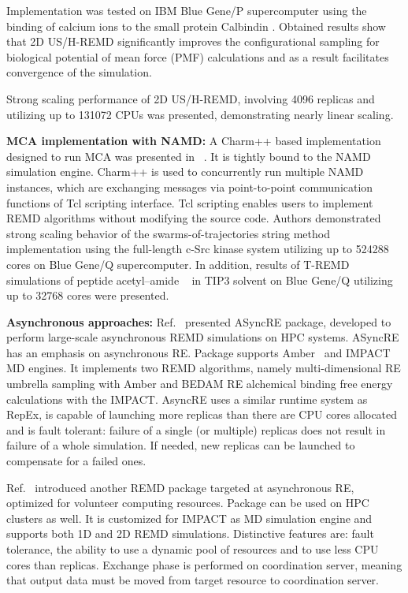 \documentclass{sig-alternate-05-2015}
\begin{document}
Implementation was tested on IBM Blue Gene/P supercomputer using the binding of calcium ions to the small protein Calbindin . Obtained results show that 2D US/H-REMD significantly improves the configurational sampling for biological potential of mean force (PMF) calculations and as a result facilitates convergence of the simulation.

Strong scaling performance of 2D US/H-REMD, involving 4096 replicas and utilizing up to 131072 CPUs was presented, demonstrating nearly linear scaling.

{\bf MCA implementation with NAMD:} A Charm++ based implementation designed to run MCA was presented in ~\cite{jiang2014}. It is tightly bound to the NAMD simulation engine. Charm++ is used to concurrently run multiple NAMD instances, which are exchanging messages via point-to-point communication functions of Tcl scripting interface. Tcl scripting enables users to implement REMD algorithms without modifying the source code.  Authors demonstrated strong scaling behavior of the swarms-of-trajectories string method implementation using the full-length c-Src kinase system utilizing up to 524288 cores on Blue Gene/Q supercomputer. In addition, results of T-REMD simulations of peptide acetyl--amide ~\cite{shalongo} in TIP3 solvent on Blue Gene/Q utilizing up to 32768 cores were presented.

{\bf Asynchronous approaches:} Ref.~\cite{2013-xsede-cdi,ct500776j} presented ASyncRE package, developed to perform large-scale asynchronous REMD simulations on HPC systems. ASyncRE has an emphasis on asynchronous RE. Package supports Amber~\cite{Amber} and IMPACT~\cite{impact2005} MD engines. It implements two REMD algorithms, namely multi-dimensional RE umbrella sampling with Amber and BEDAM  RE alchemical binding free energy calculations with the IMPACT. AsyncRE uses a similar runtime system as RepEx, is capable of launching more replicas than there are CPU cores allocated and is fault tolerant: failure of a single (or multiple) replicas does not result in failure of a whole simulation. If needed, new replicas can be launched to compensate for a failed ones.

Ref.~\cite{Xia_JComputChem_2015_v36_p1772} introduced another REMD package targeted at asynchronous RE, optimized for volunteer computing resources. Package can be used on HPC clusters as well. It is customized for IMPACT as MD simulation engine and supports both 1D and 2D REMD simulations.
Distinctive features are: fault tolerance, the ability to use a dynamic pool of resources and to use less CPU cores than replicas. Exchange phase is performed on coordination server, meaning that output data must be moved from target resource to coordination server.
\end{document}
